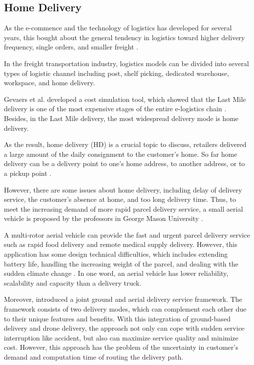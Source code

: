 \documentclass[12pt]{ksthesis}
\begin{document}
\begin{thesis}
{\section{Home Delivery}
As the e-commence and the technology of logistics has developed for several years, this bought about the general tendency in logistics toward higher delivery frequency, single orders, and smaller freight \cite{Visser2014}.


In the freight transportation industry, logistics models can be divided into several types of logistic channel including post, shelf picking, dedicated warehouse, workspace, and home delivery.

Gevaers et al. developed a cost simulation tool, which showed that the Last Mile delivery is one of the most expensive stages of the entire e-logistics chain \cite{Gevaers2014}. Besides, in the Last Mile delivery, the most widespread delivery mode is home delivery.

As the result, home delivery (HD) is a crucial topic to discuss, retailers delivered a large amount of the daily consignment to the customer’s home. So far home delivery can be a delivery point to one’s home address, to another address, or to a pickup point  \cite{Zhou2016}. 

However, there are some issues about home delivery, including delay of delivery service, the customer’s absence at home, and too long delivery time. Thus, to meet the increasing demand of more rapid parcel delivery service, a small aerial vehicle is proposed by the professors in George Mason University \cite{Ali2015}.

A multi-rotor aerial vehicle can provide the fast and urgent parcel delivery service such as rapid food delivery and remote medical supply delivery. However, this application has some design technical difficulties, which includes extending battery life, handling the increasing weight of the parcel, and dealing with the sudden climate change \cite{Ali2015}. In one word, an aerial vehicle has lower reliability, scalability and capacity than a delivery truck.

Moreover, \cite{Sawadsitang2018} introduced a joint ground and aerial delivery service framework. The framework consists of two delivery modes, which can complement each other due to their unique features and benefits. With this integration of ground-based delivery and drone delivery, the approach not only can cope with sudden service interruption like accident, but also can maximize service quality and minimize cost. However, this approach has the problem of the uncertainty in customer’s demand and computation time of routing the delivery path. 

}
\end{thesis}
\end{document}
